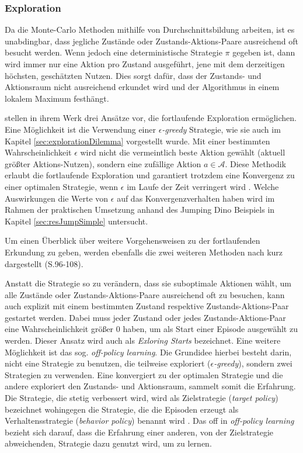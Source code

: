 \subsubsection{Exploration}\label{sec:exploration}
Da die Monte-Carlo Methoden mithilfe von Durchschnittsbildung arbeiten, ist es unabdingbar, dass jegliche Zustände oder Zustands-Aktions-Paare ausreichend oft besucht werden. Wenn jedoch eine deterministische Strategie $\pi$ gegeben ist, dann wird immer nur eine Aktion pro Zustand ausgeführt, jene mit dem derzeitigen höchsten, geschätzten Nutzen. Dies sorgt dafür, dass der Zustands- und Aktionsraum nicht ausreichend erkundet wird und der Algorithmus in einem lokalem Maximum festhängt.
\par 
\cite{Sutton1998} stellen in ihrem Werk drei Ansätze vor, die fortlaufende Exploration ermöglichen. Eine Möglichkeit ist die Verwendung einer $\epsilon$\textit{-greedy} Strategie, wie sie auch im Kapitel \ref{sec:explorationDilemma} vorgestellt wurde. Mit einer bestimmten Wahrscheinlichkeit $\epsilon$ wird nicht die vermeintlich beste Aktion gewählt (aktuell größter  Aktions-Nutzen), sondern eine zufällige Aktion $a \in \mathcal{A}$. Diese Methodik erlaubt die fortlaufende Exploration und garantiert trotzdem eine Konvergenz zu einer optimalen Strategie, wenn $\epsilon$ im Laufe der Zeit verringert wird \cite[S.~201]{Sutton1998}. Welche Auswirkungen die Werte von $\epsilon$ auf das Konvergenzverhalten haben wird im Rahmen der praktischen Umsetzung anhand des Jumping Dino Beispiels in Kapitel \ref{sec:resJumpSimple} untersucht.
\par 
Um einen Überblick über weitere Vorgehensweisen zu der fortlaufenden Erkundung zu geben, werden ebenfalls die zwei weiteren Methoden nach \cite{Sutton1998} kurz dargestellt (S.96-108). 
\par 
Anstatt die Strategie so zu verändern, dass sie suboptimale Aktionen wählt, um alle Zustände oder Zustands-Aktions-Paare ausreichend oft zu besuchen, kann auch explizit mit einem bestimmten Zustand respektive Zustands-Aktions-Paar gestartet werden. Dabei muss jeder Zustand oder jedes Zustands-Aktions-Paar eine Wahrscheinlichkeit größer 0 haben, um als Start einer Episode ausgewählt zu werden. Dieser Ansatz wird auch als \textit{Exloring Starts} bezeichnet.
\newpage
Eine weitere Möglichkeit ist das sog. \textit{off-policy learning}. Die Grundidee hierbei besteht darin, nicht eine Strategie zu benutzen, die teilweise exploriert ($\epsilon$\textit{-greedy}), sondern zwei Strategien zu verwenden. Eine konvergiert zu der optimalen Strategie und die andere exploriert den Zustands- und Aktionsraum, sammelt somit die Erfahrung. Die Strategie, die stetig verbessert wird, wird als Zielstrategie (\textit{target policy}) bezeichnet wohingegen die Strategie, die die Episoden erzeugt als Verhaltensstrategie (\textit{behavior policy}) benannt wird \cite[S.~103]{Sutton1998}. Das \glqq off \grqq{} in \textit{off-policy learning} bezieht sich darauf, dass die Erfahrung einer anderen, von der Zielstrategie abweichenden, Strategie dazu genutzt wird, um zu lernen.
